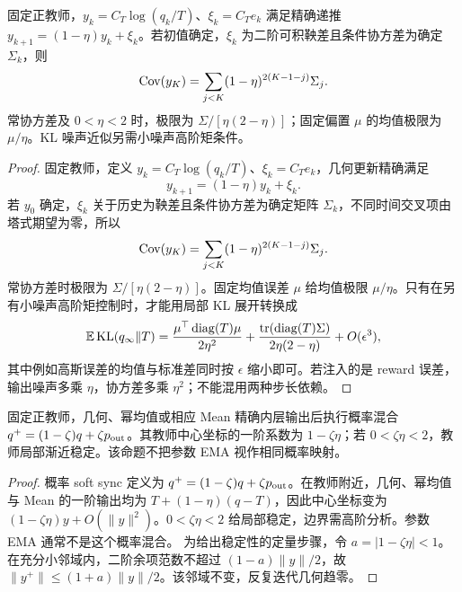 \begin{theorem}[几何更新的随机协方差传播]
固定正教师，$y_k=C_T\log(q_k/T)$、$\xi_k=C_Te_k$ 满足精确递推 $y_{k+1}=(1-\eta)y_k+\xi_k$。若初值确定，$\xi_k$ 为二阶可积鞅差且条件协方差为确定 $\Sigma_k$，则
\begin{equation}
\operatorname{Cov}(y_K)=\sum_{j<K}(1-\eta)^{2(K-1-j)}\Sigma_j.
\end{equation}
常协方差及 $0<\eta<2$ 时，极限为 $\Sigma/[\eta(2-\eta)]$；固定偏置 $\mu$ 的均值极限为 $\mu/\eta$。KL 噪声近似另需小噪声高阶矩条件。
\end{theorem}
\begin{proof}
固定教师，定义 $y_k=C_T\log(q_k/T)$、$\xi_k=C_Te_k$，几何更新精确满足
\begin{equation}
y_{k+1}=(1-\eta)y_k+\xi_k.
\end{equation}
若 $y_0$ 确定，$\xi_k$ 关于历史为鞅差且条件协方差为确定矩阵 $\Sigma_k$，不同时间交叉项由塔式期望为零，所以
\begin{equation}
\operatorname{Cov}(y_K)=\sum_{j<K}(1-\eta)^{2(K-1-j)}\Sigma_j.
\end{equation}
常协方差时极限为 $\Sigma/[\eta(2-\eta)]$。固定均值误差 $\mu$ 给均值极限 $\mu/\eta$。只有在另有小噪声高阶矩控制时，才能用局部 KL 展开转换成
\begin{equation}
\mathbb E\operatorname{KL}(q_\infty\Vert T)
=\frac{\mu^\top\operatorname{diag}(T)\mu}{2\eta^2}
+\frac{\operatorname{tr}(\operatorname{diag}(T)\Sigma)}{2\eta(2-\eta)}
+O(\epsilon^3),
\end{equation}
其中例如高斯误差的均值与标准差同时按 $\epsilon$ 缩小即可。若注入的是 reward 误差，输出噪声多乘 $\eta$，协方差多乘 $\eta^2$；不能混用两种步长依赖。
\end{proof}

\begin{proposition}
固定正教师，几何、幂均值或相应 Mean 精确内层输出后执行概率混合 $q^+=(1-\zeta)q+\zeta p_{\rm out}$。其教师中心坐标的一阶系数为 $1-\zeta\eta$；若 $0<\zeta\eta<2$，教师局部渐近稳定。该命题不把参数 EMA 视作相同概率映射。
\end{proposition}
\begin{proof}
概率 soft sync 定义为 $q^+=(1-\zeta)q+\zeta p_{\rm out}$。在教师附近，几何、幂均值与 Mean 的一阶输出均为 $T+(1-\eta)(q-T)$，因此中心坐标变为 $(1-\zeta\eta)y+O(\|y\|^2)$。$0<\zeta\eta<2$ 给局部稳定，边界需高阶分析。参数 EMA 通常不是这个概率混合。
为给出稳定性的定量步骤，令 $a=|1-\zeta\eta|<1$。在充分小邻域内，二阶余项范数不超过 $(1-a)\|y\|/2$，故 $\|y^+\|\le(1+a)\|y\|/2$。该邻域不变，反复迭代几何趋零。
\end{proof}

